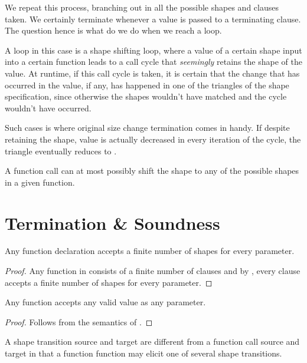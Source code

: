 We repeat this process, branching out in all the possible shapes and clauses
taken. We certainly terminate whenever a value is passed to a terminating
clause. The question hence is what do we do when we reach a loop.

A loop in this case is a shape shifting loop, where a value of a certain shape
input into a certain function leads to a call cycle that \emph{seemingly}
retains the shape of the value. At runtime, if this call cycle is taken, it is
certain that the change that has occurred in the value, if any, has happened in
one of the triangles of the shape specification, since otherwise the shapes
wouldn't have matched and the cycle wouldn't have occurred.

Such cases is where original size change termination comes in handy. If despite
retaining the shape, value is actually decreased in every iteration of the
cycle, the triangle eventually reduces to . 

A function call can at most possibly shift the shape to any of the possible
shapes in a given function.

\section{Termination \& Soundness}

\begin{lemma}\label{lemma:extend-function-finite-shape} Any function
declaration accepts a finite number of shapes for every parameter.\end{lemma}

\begin{proof} Any function in \D{} consists of a finite number of clauses and
by , every clause accepts a finite number of
shapes for every parameter.\end{proof}

\begin{lemma}\label{lemma:extend-any-function-any-value} Any function accepts
any valid \D{} value as any parameter.\end{lemma}

\begin{proof} Follows from the semantics of \D{}.\end{proof}

\begin{definition} A shape transition source and target are different from a
function call source and target in that a function function may elicit one of
several shape transitions.\end{definition}

